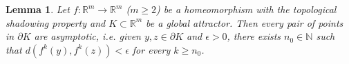 \documentclass{amsart}
\newtheorem{lemma}{Lemma}
\newcommand{\R}{{\mathbb{R}}}
\newcommand{\N}{{\mathbb{N}}}
\begin{document}
	\begin{lemma}\label{asymptotic_points}
		Let $f:\R^m\to \R^m$ ($m\geq 2$) be a homeomorphism with the topological shadowing property and $K\subset \R^m$ be a  global attractor. 
		Then every pair of points in $\partial K$ are asymptotic, i.e. given $y, z\in \partial K$ and $\epsilon>0$, there exists $n_0\in\N$ such that $d(f^k(y), f^k(z))<\epsilon$ for every $k\geq n_0$.
	\end{lemma}
\end{document}
